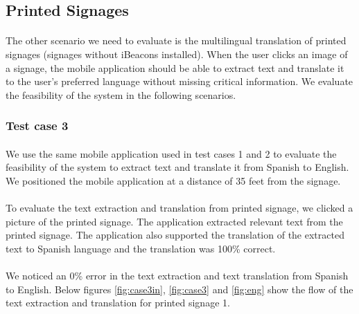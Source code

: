 \documentclass[12pt]{article}
\begin{document}
\subsection{Printed Signages }
\label{twoone}
\paragraph{}The other scenario we need to evaluate is the multilingual translation of printed signages (signages without iBeacons installed). When the user clicks an image of a signage, the mobile application should be able to extract text and translate it to the user's preferred language without missing critical information. We evaluate the feasibility of the system in the following scenarios.

\subsubsection{Test case 3}
\label{threetwo}
\paragraph{}We use the same mobile application used in test cases 1 and 2 to evaluate the feasibility of the system to extract text and translate it from Spanish to English. We positioned the mobile application at a distance of 35 feet from the signage.

\paragraph{}To evaluate the text extraction and translation from printed signage, we clicked a picture of the printed signage. The application extracted relevant text from the printed signage. The application also supported the translation of the extracted text to Spanish language and the translation was 100\% correct.

\paragraph{}We noticed an 0\% error in the text extraction and text translation from Spanish to English. Below figures \ref{fig:case3in}, \ref{fig:case3} and \ref{fig:eng} show the flow of the text extraction and translation for printed signage 1.
\end{document}
